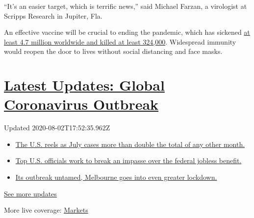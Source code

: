 ``It's an easier target, which is terrific news,'' said Michael Farzan,
a virologist at Scripps Research in Jupiter, Fla.

An effective vaccine will be crucial to ending the pandemic, which has
sickened
\href{https://www.nytimes.com/interactive/2020/world/coronavirus-maps.html}{at
least 4.7 million worldwide and killed at least 324,000}. Widespread
immunity would reopen the door to lives without social distancing and
face masks.

\hypertarget{latest-updates-global-coronavirus-outbreak}{%
\section{\texorpdfstring{\href{https://www.nytimes.com/2020/08/01/world/coronavirus-covid-19.html?action=click\&pgtype=Article\&state=default\&region=MAIN_CONTENT_1\&context=storylines_live_updates}{Latest
Updates: Global Coronavirus
Outbreak}}{Latest Updates: Global Coronavirus Outbreak}}\label{latest-updates-global-coronavirus-outbreak}}

Updated 2020-08-02T17:52:35.962Z

\begin{itemize}
\tightlist
\item
  \href{https://www.nytimes.com/2020/08/01/world/coronavirus-covid-19.html?action=click\&pgtype=Article\&state=default\&region=MAIN_CONTENT_1\&context=storylines_live_updates\#link-34047410}{The
  U.S. reels as July cases more than double the total of any other
  month.}
\item
  \href{https://www.nytimes.com/2020/08/01/world/coronavirus-covid-19.html?action=click\&pgtype=Article\&state=default\&region=MAIN_CONTENT_1\&context=storylines_live_updates\#link-780ec966}{Top
  U.S. officials work to break an impasse over the federal jobless
  benefit.}
\item
  \href{https://www.nytimes.com/2020/08/01/world/coronavirus-covid-19.html?action=click\&pgtype=Article\&state=default\&region=MAIN_CONTENT_1\&context=storylines_live_updates\#link-2bc8948}{Its
  outbreak untamed, Melbourne goes into even greater lockdown.}
\end{itemize}

\href{https://www.nytimes.com/2020/08/01/world/coronavirus-covid-19.html?action=click\&pgtype=Article\&state=default\&region=MAIN_CONTENT_1\&context=storylines_live_updates}{See
more updates}

More live coverage:
\href{https://www.nytimes.com/live/2020/07/31/business/stock-market-today-coronavirus?action=click\&pgtype=Article\&state=default\&region=MAIN_CONTENT_1\&context=storylines_live_updates}{Markets}

